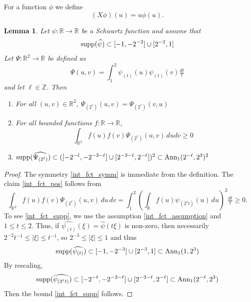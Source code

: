 \documentclass[12pt,reqno]{amsart}
\theoremstyle{plain}
\newtheorem{lemma}[theorem]{Lemma}
\numberwithin{equation}{section}
\theoremstyle{remark}
\newcommand{\Z}{{\mathbb Z}}
\newcommand{\R}{{\mathbb R}}
\begin{document}
For a function $\phi$ we define
\begin{equation}\label{auto:multiplication-operator-X}(X\phi)(u) = u\phi(u).\end{equation}


   \begin{lemma}
         \label{lem:int_fct}
          Let $\psi:\R\to \R$ be a Schwartz function and assume that
          \begin{equation}
              \label{int_fct_assumption}
              \textup{supp}(\widehat{\psi})
\subset  [-1,-2^{-2}]\cup [2^{-2},1]
          \end{equation}
     Let $\Psi:\R^2\to \R$ be defined as
     \begin{equation}\label{auto:integrated-tensor-kernel}\Psi(u,v) = \int_1^2 \psi_{(t)}(u) \psi_{(t)}(v) \tfrac{dt}{t}\end{equation}
     and let $\ell\in\Z$.
   Then
        \begin{enumerate}
    \item  \label{int_fct_symm} For all $(u,v)\in \R^2$,  $\Psi_{(2^\ell)}(u,v) = \Psi_{(2^\ell)}(v,u)$
     \item \label{int_fct_pos}  For all bounded functions $f:\R\to\R$,
     \begin{equation}\label{auto:integrated-tensor-positivity}
         \int_{\R^2} f(u){f(v)} \Psi_{(2^\ell)}(u,v)\,dudv
         \ge 0
     \end{equation}
     \item  \label{int_fct_supp}
     $         \textup{supp}(\widehat{\Psi_{(2^\ell)}})
\subset  ([-2^{-\ell},-2^{-3-\ell}]\cup [2^{-3-\ell},2^{-\ell}])^2 \subset \textup{Ann}_1(2^{-\ell},2^3)^2$
     \end{enumerate}
     \end{lemma}
          \begin{proof}
The symmetry \eqref{int_fct_symm}
 is immediate from the definition.
 The claim \eqref{int_fct_pos} follows from
          \[
\int_{\R^2}f(u)f(v)\Psi_{(2^\ell)}(u,v)\,du\,dv
=
\int_1^2\left(\int_\R f(u)\psi_{(2^\ell t)}(u)\,du\right)^2\tfrac{dt}{t}
\ge0.
\]
To see \eqref{int_fct_supp}, we use the assumption \eqref{int_fct_assumption} and $1\le t \le 2$. Thus, if  $\widehat{\psi_{(t)}}(\xi) = \widehat{\psi}(t\xi)$ is non-zero, then necessarily $2^{-2}t^{-1}\le |\xi|\le t^{-1} $, so $2^{-3}\le |\xi| \le 1 $ and thus
\[         \textup{supp}(\widehat{\psi_{(t)}})
\subset  [-1,-2^{-3}]\cup [2^{-3},1] \subset \textup{Ann}_1(1,2^3) \]
By rescaling,
\[         \textup{supp}(\widehat{\psi_{(2^\ell t)}})
\subset  [-2^{-\ell},-2^{-3-\ell}]\cup [2^{-3-\ell},2^{-\ell}] \subset \textup{Ann}_1(2^{-\ell},2^3) \]
Then the bound \eqref{int_fct_supp}
  follows.
     \end{proof}
\end{document}
